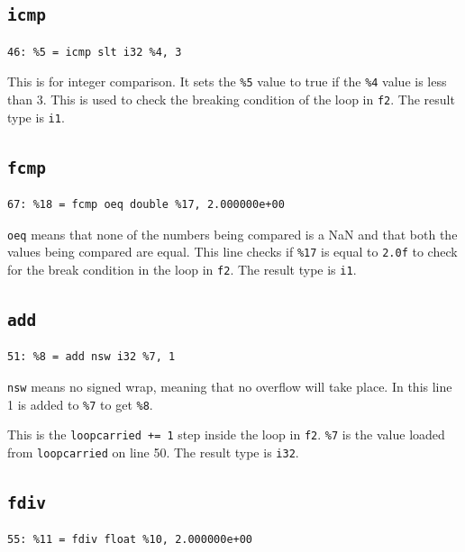\documentclass[11pt,a4paper]{article}
\begin{document}
\subsection*{\texttt{icmp}}

\begin{lstlisting}
46: %5 = icmp slt i32 %4, 3
\end{lstlisting}

This is for integer comparison. It sets the \texttt{\%5} value to true if the
\texttt{\%4} value is less than 3. This is used to check the breaking condition of
the loop in \texttt{f2}. The result type is \texttt{i1}.

\subsection*{\texttt{fcmp}}

\begin{lstlisting}
67: %18 = fcmp oeq double %17, 2.000000e+00
\end{lstlisting}

\texttt{oeq} means that none of the numbers being compared is a NaN and that both the values being compared are equal. This line
checks if \texttt{\%17} is equal to \texttt{2.0f} to check for the break condition in
the loop in \texttt{f2}. The result type is \texttt{i1}.

\subsection*{\texttt{add}}

\begin{lstlisting}
51: %8 = add nsw i32 %7, 1
\end{lstlisting}

\texttt{nsw} means no signed wrap, meaning that no overflow will take place. In
this line 1 is added to \texttt{\%7} to get \texttt{\%8}.

This is the \texttt{loopcarried += 1} step inside the loop in \texttt{f2}.
\texttt{\%7} is the value loaded from \texttt{loopcarried} on line 50. The result
type is \texttt{i32}.

\subsection*{\texttt{fdiv}}

\begin{lstlisting}
55: %11 = fdiv float %10, 2.000000e+00
\end{lstlisting}
\end{document}
